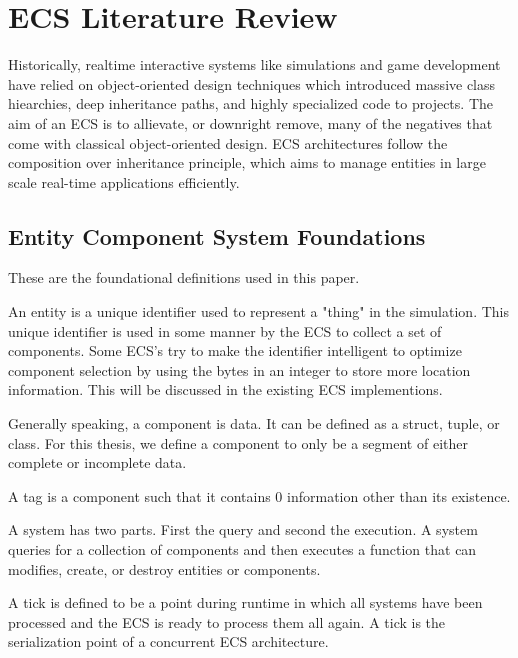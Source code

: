 \section{ECS Literature Review}
\label{chap:1}

Historically, realtime interactive systems like simulations and game development have relied on object-oriented design techniques which introduced massive class hiearchies, deep inheritance paths, and highly specialized code to projects. The aim of an ECS is to allievate, or downright remove, many of the negatives that come with classical object-oriented design. ECS architectures follow the composition over inheritance principle, which aims to manage entities in large scale real-time applications efficiently. \cite{Haerkoenen2019} 

\subsection{Entity Component System Foundations}
These are the foundational definitions used in this paper.

\begin{tdefn}[Entity]
    An entity is a unique identifier used to represent a "thing" in the simulation. This unique identifier is used in some manner by the ECS to collect a set of components. Some ECS's try to make the identifier intelligent to optimize component selection by using the bytes in an integer to store more location information. This will be discussed in the existing ECS implementions.
\end{tdefn}
\begin{tdefn}[Component]
    Generally speaking, a component is data. It can be defined as a struct, tuple, or class. For this thesis, we define a component to only be a segment of either complete or incomplete data.
\end{tdefn}
\begin{tdefn}[Tag]
    A tag is a component such that it contains 0 information other than its existence.
\end{tdefn}
\begin{tdefn}[System]
    A system has two parts. First the query and second the execution. A system queries for a collection of components and then executes a function that can modifies, create, or destroy entities or components.
\end{tdefn}
\begin{tdefn}[Tick]
    A tick is defined to be a point during runtime in which all systems have been processed and the ECS is ready to process them all again. A tick is the serialization point of a concurrent ECS architecture.
\end{tdefn}


